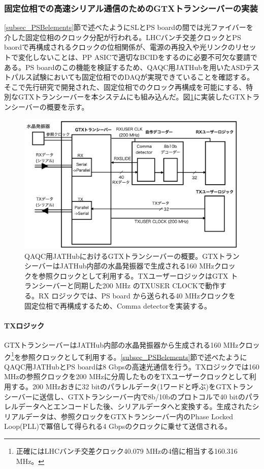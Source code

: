 \subsubsection{固定位相での高速シリアル通信のためのGTXトランシーバーの実装}
\baselineskip
\label{subsubsec_gtx}
\ref{subsec_PSBelements}節で述べたようにSLとPS boardの間では光ファイバーを介した固定位相のクロック分配が行われる。LHCバンチ交差クロックとPS baordで再構成されるクロックの位相関係が、電源の再投入や光リンクのリセットで変化しないことは、PP ASICで適切なBCIDをするのに必要不可欠な要請である。PS boardのこの機能を検証するため、QAQC用JATHubを用いたASDテストパルス試験においても固定位相でのDAQが実現できていることを確認する。そこで先行研究\cite{mt_aoki}で開発された、固定位相でのクロック再構成を可能にする、特別なGTXトランシーバーを本システムにも組み込んだ。図\ref{JATHubgtx}に実装したGTXトランシーバーの概要を示す。
\baselineskip

\begin{figure} 
\centering
\includegraphics[width=16cm]{fig/QAQC/JATHubgtx.png}
\caption[QAQC用JATHubにおけるGTXトランシーバーの概要]{QAQC用JATHubにおけるGTXトランシーバーの概要。GTXトランシーバーはJATHub内部の水晶発振器で生成される160 MHzクロックを参照クロックとして利用する。TXユーザーロジックはGTX トランシーバーと同期した200 MHz のTXUSER CLOCKで動作する。RX ロジックでは、PS board から送られる40 MHzクロックを固定位相で再構成するため、Comma detectorを実装する。}
\label{JATHubgtx}
\end{figure}


\paragraph{TXロジック} \par
GTXトランシーバーはJATHub内部の水晶発振器から生成される160 MHzクロック\footnote{正確にはLHCバンチ交差クロック40.079 MHzの4倍に相当する160.316 MHz。}を参照クロックとして利用する。\ref{subsec_PSBelements}節で述べたようにQAQC用JATHubとPS boardは8 Gbpsの高速光通信を行う。TXロジックでは160 MHzの参照クロックを200 MHzに分周したものをTXユーザークロックとして利用する。200 MHzおきに32 bitのパラレルデータ(1ワードと呼ぶ)をGTXトランシーバーに送信し、GTXトランシーバー内で8b/10bのプロトコルで40 bitのパラレルデータへとエンコードした後、シリアルデータへと変換する。生成されたシリアルデータは、参照クロックをGTXトランシーバー内のPhase Locked Loop(PLL)で冪倍して得られる4 Gbpsのクロックに乗せて送信される。
\baselineskip

